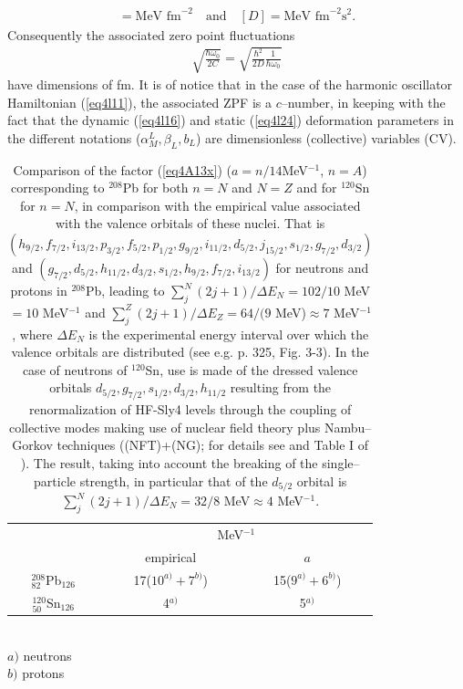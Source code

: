 \begin{subappendices}
\begin{align*}
[C]=\text{MeV fm}^{-2}\quad\text{and}\quad [D]=\text{MeV fm}^{-2}\text{s}^2.
\end{align*}
Consequently the associated zero point fluctuations
\begin{align}\label{eq4A18}
\sqrt{\frac{\hbar\omega_0}{2C}}=\sqrt{\frac{\hbar^2}{2D}\frac{1}{\hbar\omega_0}}
\end{align}
have dimensions of fm. It is of notice that in the case of the harmonic oscillator Hamiltonian (\ref{eq4l11}), the associated ZPF is a $c$--number, in keeping with the fact that the dynamic (\ref{eq4l16}) and static (\ref{eq4l24}) deformation parameters in the different notations ($\alpha^L_M,\beta_L,b_L$) are  dimensionless (collective) variables (CV). 
    \begin{table}
    \centering
    \begin{tabular}{|c|c|c|}
\hline
&\multicolumn{2}{c|}{MeV$^{-1}$}\\
\cline{2-3}
&empirical& $a$\\
\hline
$^{208}_{82}$Pb$_{126}$& 17($10^{a)}+7^{b)}$)& 15($9^{a)}+6^{b)}$)\\
\hline
$^{120}_{50}$Sn$_{126}$& 4$^{a)}$& 5$^{a)}$\\
\hline
    \end{tabular}\\$a)$ neutrons\\$b)$ protons\\\caption{
    Comparison of the factor (\ref{eq4A13x}) ($a=n/14$MeV$^{-1}$, $n=A$) corresponding to $^{208}$Pb for both $n=N$ and $N=Z$ and for $^{120}$Sn for $n=N$, in comparison with the empirical value associated with the valence orbitals of these nuclei. That is $(h_{9/2},f_{7/2},i_{13/2},p_{3/2},f_{5/2},p_{1/2},g_{9/2},i_{11/2},d_{5/2},j_{15/2},s_{1/2},g_{7/2},d_{3/2})$ and $(g_{7/2},d_{5/2},h_{11/2},d_{3/2},s_{1/2},h_{9/2},f_{7/2},i_{13/2})$ for neutrons and protons in $^{208}$Pb, leading to $\sum_j^N(2j+1)/\Delta E_N=102/10$ MeV$=10$ MeV$^{-1}$ and $\sum_j^Z(2j+1)/\Delta E_Z=64/(9$ MeV)$\approx7$ MeV$^{-1}$, where $\Delta E_N$ is the experimental energy interval over which the valence orbitals are distributed (see e.g. \cite{Bohr:69} p. 325, Fig. 3-3). In the case of neutrons of $^{120}$Sn, use is made of the dressed valence orbitals $d_{5/2},g_{7/2},s_{1/2},d_{3/2},h_{11/2}$ resulting from the renormalization of HF-Sly4 levels through the coupling of collective modes making use of nuclear field theory plus Nambu--Gorkov techniques ((NFT)+(NG); for details see \cite{Idini:15} and Table I of \cite{Potel:17}). The result, taking into account the breaking of the single--particle strength, in particular that of the $d_{5/2}$ orbital is $\sum_j^N(2j+1)/\Delta E_N=32/8$ MeV$\approx4$ MeV$^{-1}$.}\label{tab4A1}
    \end{table}

\end{subappendices}
